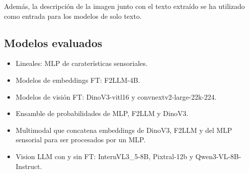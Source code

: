 \documentclass[11pt,a4paper]{article}
\begin{document}
	Además, la descripción de la imagen junto con el texto extraído se ha utilizado como entrada para los modelos de solo texto.
	
\subsection{Modelos evaluados}
\begin{itemize}
	\item Lineales: MLP de caraterísticas sensoriales.
    \item Modelos de embeddings FT: F2LLM-4B.
    \item Modelos de visión FT: DinoV3-vitl16 y convnextv2-large-22k-224.
    \item Ensamble de probabilidades de MLP, F2LLM y DinoV3.
    \item Multimodal que concatena embeddings de DinoV3, F2LLM y del MLP sensorial para ser procesados por un MLP.
    \item Vision LLM con y sin FT: InternVL3\_5-8B, Pixtral-12b y Qwen3-VL-8B-Instruct.
\end{itemize}
\end{document}
